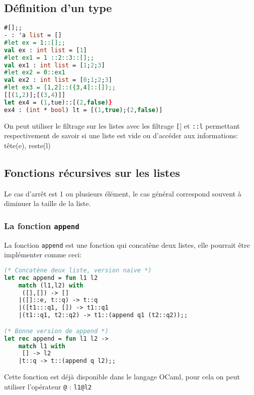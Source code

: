 \subsection{Définition d'un type}

\begin{exemple}
	\begin{lstlisting}[language=Caml, caption=Exemple de listes, numbers=none, framerule=0pt]
#[];;
- : 'a list = []
#let ex = 1::[];;
val ex : int list = [1]
#let ex1 = 1 ::2::3::[];;
val ex1 : int list = [1;2;3]
#let ex2 = 0::ex1
val ex2 : int list = [0;1;2;3]
#let ex3 = [1,2]::({3,4]::[]);;
[[(1,2)];[(3,4)]]
let ex4 = (1,tue)::[(2,false)}
ex4 : (int * bool) lt = [(1,true);(2,false)]
	\end{lstlisting}
	\end{exemple}

	On peut utiliser le filtrage sur les listes avec les filtrage \texttt[] et \texttt{::l} permettant respectivement de savoir si une liste est vide ou
	d'accéder aux informations: tête(e), reste(l)

	\subsection{Fonctions récursives sur les listes}
	Le cas d'arrêt est 1 ou plusieurs élément, le cas général correspond souvent à diminuer la taille de la liste.



\subsubsection{La fonction \texttt{append}}
La fonction \texttt{append} est une fonction qui concatène deux listes, elle pourrait être implémenter comme ceci: 
\begin{lstlisting}[language=Caml, caption=Exemple d'implémentation de \texttt{append}]
(* Concatène deux liste, version naive *)
let rec append = fun l1 l2 
    match (l1,l2) with
     ([],[]) -> [] 
    |([]::e, t::q) -> t::q
    |([t1:::q1, []) -> t1::q1
    |(t1::q1, t2::q2) -> t1::(append q1 (t2::q2));;

(* Bonne version de append *)
let rec append = fun l1 l2 ->
    match l1 with
     [] -> l2
    |t::q -> t::(append q l2);;
\end{lstlisting}

\begin{remarque}
Cette fonction est déjà disponible dans le langage OCaml, pour cela on peut utiliser l'opérateur \texttt{@} : \texttt{l1@l2}
\end{remarque}

